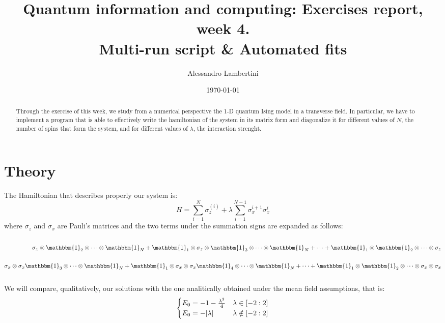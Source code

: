 \documentclass[prb,9pt,notitlepage]{revtex4-1}
\begin{document}
\title{Quantum information and computing: Exercises report, week 4. \\ Multi-run script \& Automated fits }

\author{Alessandro Lambertini}


\date{\today}

\begin{abstract}
Through the exercise of this week,  we study from a numerical perspective the 1-D quantum Ising model in a transverse field. In particular, we have to implement a program that is able to effectively write the hamiltonian of the system in its matrix form and diagonalize it for different values of $N$, the number of spins that form the system, and for different values of $\lambda$, the interaction strenght.
\end{abstract}

\maketitle

\section{Theory}
The Hamiltonian that describes properly our system is:
\begin{equation}
  H = \sum_{i=1}^N \sigma_z^{(i)} + \lambda\sum_{i=1}^{N-1}\sigma_x^{i+1}\sigma_x^{i}
\end{equation}
where $\sigma_z$ and $\sigma_x$ are Pauli's matrices and the two terms under the summation signs are expanded as follows:
\begin{eqnarray}
\nonumber\\
\sigma_z \otimes \mathbbm{1}_2\otimes\dots\otimes\mathbbm{1}_N + \mathbbm{1}_1\otimes\sigma_z\otimes \mathbbm{1}_3\otimes\dots\otimes\mathbbm{1}_N+\dots+\mathbbm{1}_1\otimes\mathbbm{1}_2\otimes\dots\otimes\sigma_z \label{first_term}\\\nonumber
\\
\sigma_x \otimes \sigma_x\mathbbm{1}_3\otimes\dots\otimes\mathbbm{1}_N + \mathbbm{1}_1\otimes\sigma_x\otimes\sigma_x \mathbbm{1}_4\otimes\dots\otimes\mathbbm{1}_N+\dots+\mathbbm{1}_1\otimes\mathbbm{1}_2\otimes\dots\otimes\sigma_x\otimes\sigma_x \label{second_term} \\\nonumber
\end{eqnarray}
We will compare, qualitatively, our solutions with the one analitically obtained under the mean field assumptions, that is:
\begin{equation}
\begin{cases}
E_0 = -1-\frac{\lambda^2}{4} & \lambda \in [-2:2] \\
E_0 = -\abs{\lambda} & \lambda \notin [-2:2]
\end{cases}
\end{equation}
\end{document}
